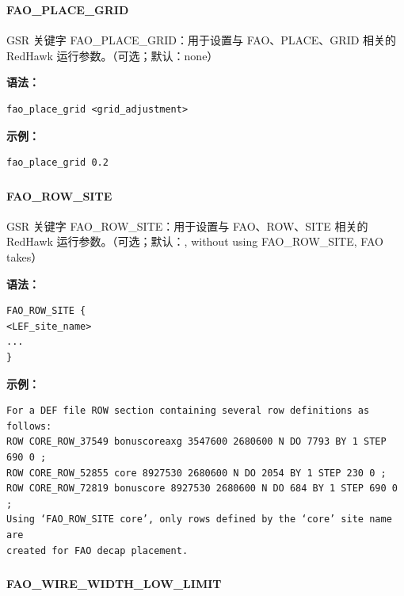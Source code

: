 \subsubsection{}
\paragraph*{FAO_PLACE_GRID}

GSR 关键字 FAO_PLACE_GRID：用于设置与 FAO、PLACE、GRID 相关的 RedHawk 运行参数。（可选；默认：none）

\textbf{语法：}
\begin{lstlisting}
fao_place_grid <grid_adjustment>
\end{lstlisting}

\textbf{示例：}
\begin{lstlisting}
fao_place_grid 0.2
\end{lstlisting}

\subsubsection{}
\paragraph*{FAO_ROW_SITE}

GSR 关键字 FAO_ROW_SITE：用于设置与 FAO、ROW、SITE 相关的 RedHawk 运行参数。（可选；默认：, without using FAO_ROW_SITE, FAO takes）

\textbf{语法：}
\begin{lstlisting}
FAO_ROW_SITE {
<LEF_site_name>
...
}
\end{lstlisting}

\textbf{示例：}
\begin{lstlisting}
For a DEF file ROW section containing several row definitions as follows:
ROW CORE_ROW_37549 bonuscoreaxg 3547600 2680600 N DO 7793 BY 1 STEP 690 0 ;
ROW CORE_ROW_52855 core 8927530 2680600 N DO 2054 BY 1 STEP 230 0 ;
ROW CORE_ROW_72819 bonuscore 8927530 2680600 N DO 684 BY 1 STEP 690 0 ;
Using ‘FAO_ROW_SITE core’, only rows defined by the ‘core’ site name are
created for FAO decap placement.
\end{lstlisting}

\subsubsection{}
\paragraph*{FAO_WIRE_WIDTH_LOW_LIMIT}

